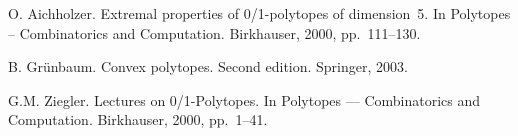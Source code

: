 \documentclass[12pt]{article}
\begin{document}
\begin{thebibliography}{99}
 
  O. Aichholzer.  
  Extremal properties of 0/1-polytopes of dimension~5.
  In Polytopes -- Combinatorics and Computation. Birkhauser, 2000, pp.~111--130.

    
  B. Gr\"unbaum.
  Convex polytopes. Second edition.
  Springer, 2003. 
		
  G.M. Ziegler.
  Lectures on 0/1-Polytopes.
	In Polytopes --- Combinatorics and Computation. Birkhauser, 2000, pp.~1--41.

\end{thebibliography}
\end{document}
